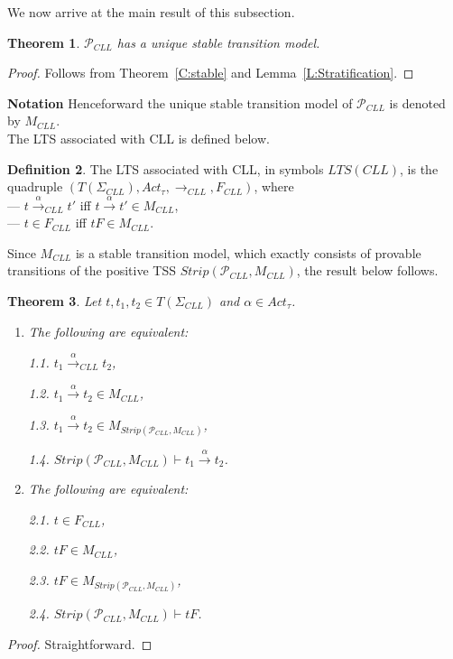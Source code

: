 \documentclass{elsarticle}
\theoremstyle{plain}
\newtheorem{theorem}{Theorem}[section]
\theoremstyle{definition}
\newtheorem{mydefn}[theorem]{Definition}
\begin{document}
We now arrive at the main result of this subsection.

\begin{theorem}
    ${\mathcal P}_{CLL}$ has a unique stable transition model.
\end{theorem}
\begin{proof}
Follows from Theorem~\ref{C:stable} and Lemma~\ref{L:Stratification}.
\end{proof}

\noindent\textbf{Notation}
Henceforward the unique stable transition model of ${\mathcal P}_{CLL}$ is denoted by $M_{CLL}$.  \\

The LTS associated with CLL is defined below.

\begin{mydefn}
    The LTS associated with CLL, in symbols $LTS(CLL)$, is the quadruple
    $(T(\Sigma_{CLL}),Act_{\tau},\longrightarrow_{CLL},F_{CLL})$, where \\
    --- $t \stackrel{\alpha}{\longrightarrow}_{CLL} t'$ iff $t\stackrel{\alpha}{\longrightarrow} t' \in M_{CLL}$,\\
    --- $t\in F_{CLL}$ iff $tF \in M_{CLL}$.
\end{mydefn}

Since $M_{CLL}$ is a stable transition model, which exactly consists of provable transitions of the positive TSS $Strip({\mathcal P}_{CLL},M_{CLL})$, the result below follows.

\begin{theorem}
    Let $t,t_1,t_2 \in T(\Sigma_{CLL})$ and $\alpha \in Act_{\tau}$.
  \begin{enumerate}
     \item The following are equivalent:

            1.1. $t_1 \stackrel{\alpha}{\longrightarrow}_{CLL}t_2$,

            1.2. $t_1 \stackrel{\alpha}{\longrightarrow}t_2 \in M_{CLL}$,

            1.3. $t_1 \stackrel{\alpha}{\longrightarrow}t_2 \in M_{Strip({\mathcal P}_{CLL},M_{CLL})}$,

            1.4. $Strip({\mathcal P}_{CLL},M_{CLL})\vdash t_1 \stackrel{\alpha}{\longrightarrow}t_2$.

     \item The following are equivalent:

            2.1. $t\in F_{CLL}$,

            2.2. $tF \in M_{CLL}$,

            2.3. $tF \in M_{Strip({\mathcal P}_{CLL},M_{CLL})}$,

            2.4. $Strip({\mathcal P}_{CLL},M_{CLL})\vdash tF$.

   \end{enumerate}
\end{theorem}
\begin{proof}
  Straightforward.
\end{proof}
\end{document}

